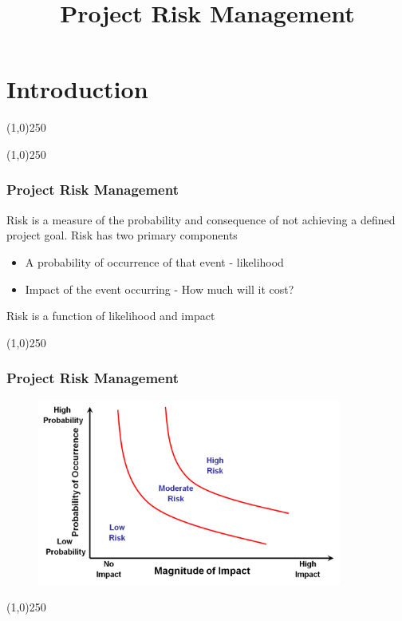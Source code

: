 



%
\title[Project Risk Management]{Project Risk Management}


%
\usetikzlibrary{arrows}



\newpage
\tableofcontents

\newpage

\thispagestyle{empty}
\tableofcontents
\newpage
\section{Introduction}



\begin{frame}
\titlepage
\end{frame}\begin{center}\line(1,0){250}\end{center}
%
%
\begin{center}\line(1,0){250}\end{center}

\begin{frame}
\frametitle{Project Risk Management}
Risk is a measure of the probability and consequence of not achieving a defined project goal.
Risk has two primary components
\begin{itemize}
	\item A probability of occurrence of that event - likelihood
	\item Impact of the event occurring - How much will it cost?
\end{itemize}
Risk is a function of likelihood and impact
\end{frame}


\begin{center}\line(1,0){250}\end{center}

\begin{frame}
\frametitle{Project Risk Management}
\begin{figure}[h]
	\centering
		\includegraphics[width=10cm]{images/MagImpact.png}
	\label{fig:MagImpact}
\end{figure}


\end{frame}\begin{center}\line(1,0){250}\end{center}



